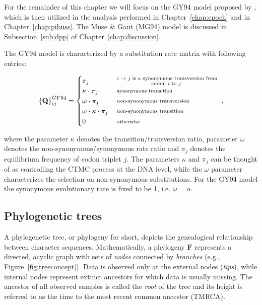 For the remainder of this chapter we will focus on the GY94 model proposed by \cite{Goldman1994}, which is then utilized in the analysis performed in Chapter~\ref{chap:epoch} and in Chapter~\ref{chap:pibuss}.  
The Muse \& Gaut (MG94) model is discussed in Subsection~\ref{sub:dpp} of Chapter~\ref{chap:discussion}.

The GY94 model is characterized by a substitution rate matrix with following entries:

\begin{equation}
\left\{ \mathbf{Q}\right\} _{ij}^{GY94}=
\begin{cases}
\pi_{j} & \substack{ \text{ \ensuremath{i\rightarrow j} is a synonymous transversion from } \\ \text{codon \ensuremath{i} to \ensuremath{j} } } \\  
\kappa\cdot\pi_{j} & \substack{ \text{ synonymous transition } } \\
\omega\cdot\pi_{j} & \substack{ \text{ non-synonymous transversion } } \\
\omega\cdot\kappa\cdot\pi_{j} & \substack{ \text{ non-synonymous transition } } \\
0 & \substack{ \text{ otherwise} }
\end{cases},
\label{eq:gy94}
\end{equation}

\noindent
where the parameter $\kappa$ denotes the transition/transversion ratio, parameter $\omega$ denotes the non-synonymous/synonymous
rate ratio and $\pi_j$ denotes the equilibrium frequency of codon triplet $j$.
The parameters $\kappa$ and $\pi_j$ can be thought of as controlling the CTMC process at the DNA level, while the $\omega$ parameter characterizes the selection on non-synonymous substitutions.
For the GY94 model the synonymous evolutionary rate is fixed to be 1, i.e. $\omega=\alpha$.

\subsection{Phylogenetic trees}


A phylogenetic tree, or phylogeny for short, depicts the genealogical relationship between character sequences.
Mathematically, a phylogeny $\mathbf{F}$ represents a directed, acyclic graph with sets of \emph{nodes} connected by \emph{branches} (e.g., Figure~\ref{fig:treeconcept}).
Data is observed only at the external nodes (\emph{tips}), while internal nodes represent extinct ancestors for which data is usually missing.
The ancestor of all observed samples is called the \emph{root} of the tree and its height is referred to as the time to the most recent common ancestor (TMRCA).

